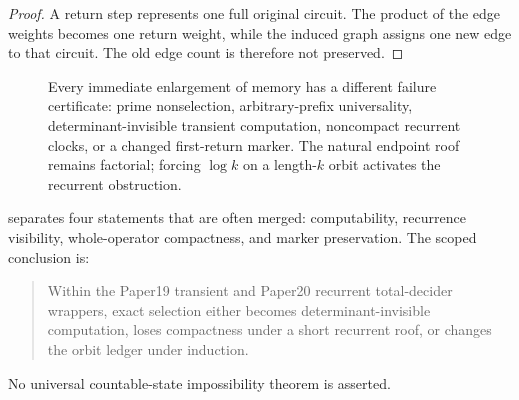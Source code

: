 \begin{proof}
A return step represents one full original circuit.  The product of the
edge weights becomes one return weight, while the induced graph assigns one
new edge to that circuit.  The old edge count is therefore not preserved.
\end{proof}

\begin{figure}[t]
  \centering
  \resizebox{\textwidth}{!}{}
  \caption{Every immediate enlargement of memory has a different failure
  certificate: prime nonselection, arbitrary-prefix universality,
  determinant-invisible transient computation, noncompact recurrent clocks,
  or a changed first-return marker.  The natural endpoint roof remains
  factorial; forcing \(\log k\) on a length-\(k\) orbit activates the
  recurrent obstruction.}
  \label{fig:memorydecision}
\end{figure}

 separates four statements that are often merged:
computability, recurrence visibility, whole-operator compactness, and
marker preservation.  The scoped conclusion is:
\begin{quote}
Within the Paper19 transient and Paper20 recurrent total-decider wrappers,
exact selection either becomes determinant-invisible computation, loses
compactness under a short recurrent roof, or changes the orbit ledger under
induction.
\end{quote}
No universal countable-state impossibility theorem is asserted.
